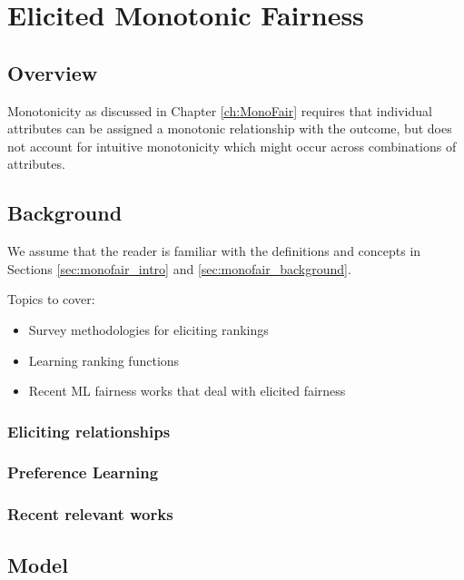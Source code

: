 \chapter{Elicited Monotonic Fairness}
\label{ch:SoftMonoFair}

\section{Overview}

    Monotonicity as discussed in Chapter \ref{ch:MonoFair} requires that individual attributes can be assigned a monotonic relationship with the outcome, but does not account for intuitive monotonicity which might occur across combinations of attributes.  

\section{Background}\label{sec:softmono_bg}
    
    We assume that the reader is familiar with the definitions and concepts in Sections \ref{sec:monofair_intro} and \ref{sec:monofair_background}.
    
    Topics to cover:
    \begin{itemize}
        \item Survey methodologies for eliciting rankings
        \item Learning ranking functions
        \item Recent ML fairness works that deal with elicited fairness
    \end{itemize}
    
    \subsection{Eliciting relationships}
    
    \subsection{Preference Learning}
    
    \subsection{Recent relevant works}
    
\section{Model}\label{sec:softmono_model}

